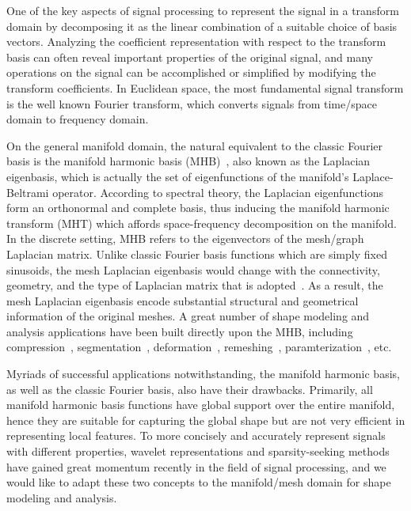 One of the key aspects of signal processing to represent the signal in a transform domain
by decomposing it as the linear combination of a suitable choice of basis vectors.
Analyzing the coefficient representation with respect to the transform basis can often reveal
important properties of the original signal, and many operations on the signal can be
accomplished or simplified by modifying the transform coefficients. In Euclidean space,
the most fundamental signal transform is the well known Fourier transform, which converts
signals from time/space domain to frequency domain.

On the general manifold domain, the natural equivalent to the classic Fourier basis is the
manifold harmonic basis (MHB)~\cite{Vallet2008}, also known as the Laplacian eigenbasis,
which is actually the set of eigenfunctions of the manifold's Laplace-Beltrami operator.
According to spectral theory, the Laplacian eigenfunctions form an orthonormal and complete
basis, thus inducing the manifold harmonic transform (MHT) which affords space-frequency
decomposition on the manifold. In the discrete setting, MHB refers to the eigenvectors of the
mesh/graph Laplacian matrix. Unlike classic Fourier basis functions which are simply fixed
sinusoids, the mesh Laplacian eigenbasis would change with the connectivity, geometry, and the
type of Laplacian matrix that is adopted~\cite{Zhang:2010:CGF}. As a result, the mesh Laplacian
eigenbasis encode substantial structural and geometrical information of the original meshes. A
great number of shape modeling and analysis applications have been built directly upon the MHB,
including compression~\cite{Karni2000}, segmentation~\cite{Liu2007},
deformation~\cite{Rong2008}, remeshing~\cite{dong2006spectral},
paramterization~\cite{Zhou2004}, etc.

Myriads of successful applications notwithstanding, the manifold harmonic basis, as well as the
classic Fourier basis, also have their drawbacks. Primarily, all manifold harmonic basis
functions have global support over the entire manifold, hence they are suitable for capturing
the global shape but are not very efficient in representing local features. To more concisely
and accurately represent signals with different properties, wavelet representations and
sparsity-seeking methods have gained great momentum recently in the field of signal
processing, and we would like to adapt these two concepts to the manifold/mesh domain for shape
modeling and analysis.

